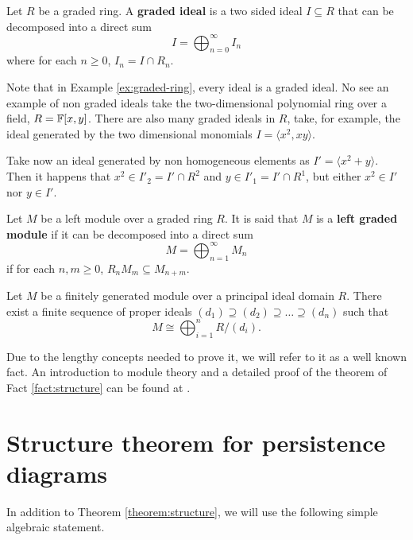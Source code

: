\begin{definition}
    Let $ R $ be a graded ring. A {\bf graded ideal} is a two sided ideal $ I \subseteq R $ that can be decomposed into a direct sum
    \begin{equation}
        I = \bigoplus_{n=0}^{\infty} I_n
    \end{equation}
    where for each $n \geq 0 $, $ I_n = I \cap R_n $.
\end{definition}

\begin{example}
    Note that in Example \ref{ex:graded-ring}, every ideal is a graded ideal. No see an example of non graded ideals take the two-dimensional polynomial ring over a field, $ R = \mathbb F[x, y] $. There are also many graded ideals in $ R $, take, for example, the ideal generated by the two dimensional monomials $ I = \langle x^2, xy \rangle $.

    Take now an ideal generated by non homogeneous elements as $ I' = \langle x^2 + y \rangle $. Then it happens that $ x^2 \in I'_2 = I' \cap R^2 $ and $ y \in I'_1 = I' \cap R^1 $, but either $ x^2 \in I' $ nor $ y \in I' $.
\end{example}

\begin{definition}
    Let $M$ be a left module over a graded ring $ R $. It is said that $ M $ is a {\bf left graded module} if it can be decomposed into a direct sum
    $$
        M = \bigoplus_{n=1}^{\infty} M_n
    $$
    if for each $n, m \geq 0 $, $ R_n M_m \subseteq M_{n+m} $.
\end{definition}

\begin{theorem} \label{theorem:structure}
    Let $ M $ be a  finitely generated module over a principal ideal domain $R$. There exist a finite sequence of proper ideals $ (d_1) \supseteq (d_2) \supseteq \dots \supseteq (d_n) $ such that
    $$
        M \cong \bigoplus_{i=1}^n R / (d_i).
    $$
\end{theorem}

Due to the lengthy concepts needed to prove it, we will refer to it as a well known fact. An introduction to module theory and a detailed proof of the theorem of Fact \ref{fact:structure} can be found at \cite[Chapter IV]{hungerford}.

\section{Structure theorem for persistence diagrams} \label{sec:structure-persistence}
In addition to Theorem \ref{theorem:structure}, we will use the following simple algebraic statement.

